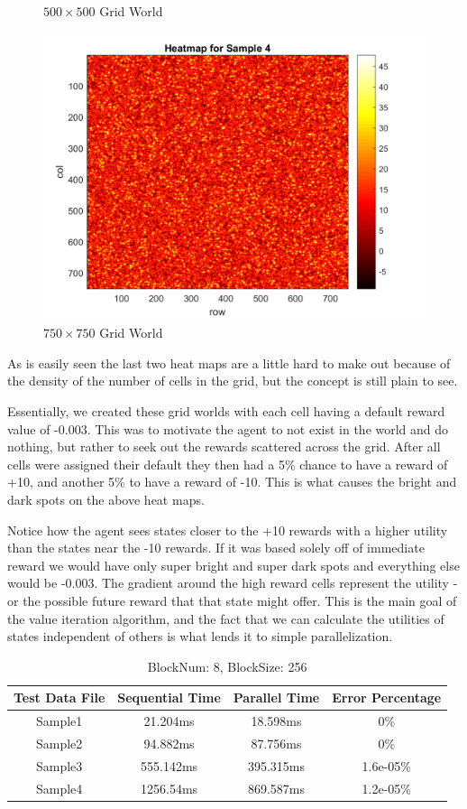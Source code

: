 \documentclass[letterpaper,twocolumn,10pt]{article}
\begin{document}
{\begin{figure}
	\caption{$500\times500$ Grid World}
\end{figure}
\begin{figure}
	\centering
	\includegraphics[scale=0.27]{sample4_hm}
	\caption{$750\times750$ Grid World}
\end{figure}
As is easily seen the last two heat maps are a little hard to make out because of the density of the number of cells in the grid, but the concept is still plain to see.

Essentially, we created these grid worlds with each cell having a default reward value of -0.003. This was to motivate the agent to not exist in the world and do nothing, but rather to seek out the rewards scattered across the grid. After all cells were assigned their default they then had a 5\% chance to have a reward of +10, and another 5\% to have a reward of -10. This is what causes the bright and dark spots on the above heat maps.

Notice how the agent sees states closer to the +10 rewards with a higher utility than the states near the -10 rewards. If it was based solely off of immediate reward we would have only super bright and super dark spots and everything else would be -0.003. The gradient around the high reward cells represent the utility - or the possible future reward that that state might offer. This is the main goal of the value iteration algorithm, and the fact that we can calculate the utilities of states independent of others is what lends it to simple parallelization.

\begin{table}[H]
	\scriptsize
	\centering
	\caption{BlockNum: 8, BlockSize: 256}
	\label{tab:table1}
	\begin{tabular}{cccc}
		\toprule
		Test Data File & Sequential Time & Parallel Time & Error Percentage\\
		\midrule
		Sample1 & 21.204ms & 18.598ms & 0\%\\
		Sample2 & 94.882ms & 87.756ms & 0\%\\
		Sample3 & 555.142ms & 395.315ms & 1.6e-05\%\\
		Sample4 & 1256.54ms & 869.587ms & 1.2e-05\%\\
		\bottomrule
	\end{tabular}
\end{table}


}
\end{document}
